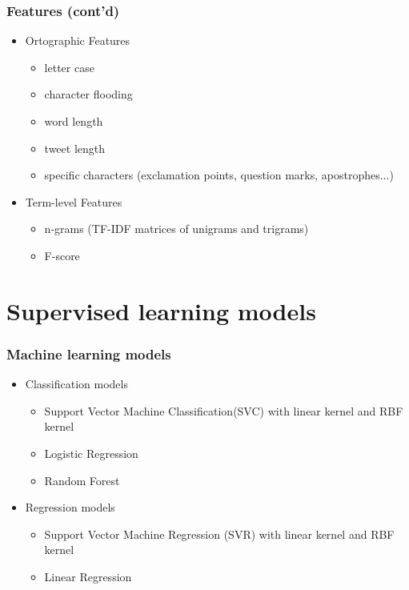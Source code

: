 \documentclass[slidestop,compress,11pt,xcolor=dvipsnames]{beamer}
\begin{document}
\begin{frame}
\frametitle{Features (cont'd)}
\begin{itemize}
	\setlength\itemsep{2mm}
	\item Ortographic Features
	\begin{itemize}
		\item letter case
		\item character flooding
		\item word length
		\item tweet length
		\item specific characters (exclamation points, question marks, apostrophes...)
	\end{itemize}
	\item Term-level Features
	\begin{itemize}
		\item n-grams (TF-IDF matrices of unigrams and trigrams)
		\item F-score
	\end{itemize}
\end{itemize}
\end{frame}

\section{Supervised learning models}

\begin{frame}
\centering
\frametitle{Machine learning models}
\begin{itemize}
 	\item Classification models
 	\begin{itemize}
 		\item Support Vector Machine Classification(SVC) with linear kernel and RBF kernel
 		\item Logistic Regression
 		\item Random Forest
 	\end{itemize}
 	\item Regression models
 	\begin{itemize}
 		\item Support Vector Machine Regression (SVR) with linear kernel and RBF kernel
 		\item Linear Regression
 	\end{itemize}
 	
\end{itemize}

\end{frame}
\end{document}
